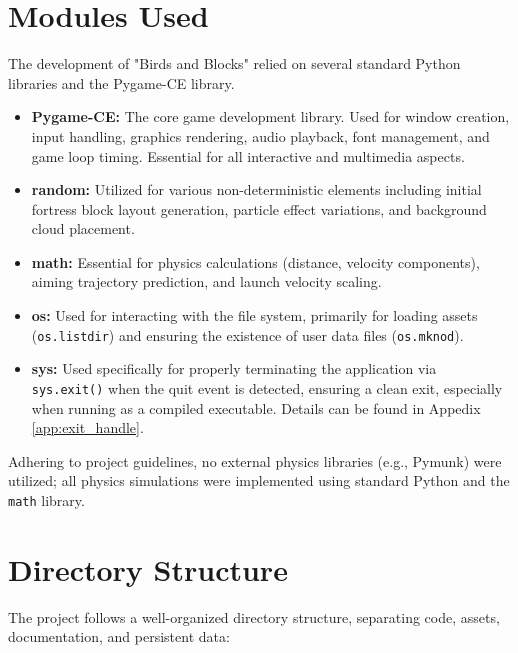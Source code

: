 \documentclass[11pt, a4paper]{article}
\begin{document}
\vspace{4cm}

\section{Modules Used}

The development of "Birds and Blocks" relied on several standard Python libraries and the Pygame-CE library.

\begin{itemize}
    \item \textbf{Pygame-CE:} The core game development library. Used for window creation, input handling, graphics rendering, audio playback, font management, and game loop timing. Essential for all interactive and multimedia aspects.

    \item \textbf{random:} Utilized for various non-deterministic elements including initial fortress block layout generation, particle effect variations, and background cloud placement.
    
    \item \textbf{math:} Essential for physics calculations (distance, velocity components), aiming trajectory prediction, and launch velocity scaling.
    
    \item \textbf{os:} Used for interacting with the file system, primarily for loading assets (\texttt{os.listdir}) and ensuring the existence of user data files (\texttt{os.mknod}).
    
    \item \textbf{sys:} Used specifically for properly terminating the application via \texttt{sys.exit()} when the quit event is detected, ensuring a clean exit, especially when running as a compiled executable. Details can be found in Appedix \ref{app:exit_handle}.

\end{itemize}

Adhering to project guidelines, no external physics libraries (e.g., Pymunk) were utilized; all physics simulations were implemented using standard Python and the \texttt{math} library.

\newpage

\section{Directory Structure}

The project follows a well-organized directory structure, separating code, assets, documentation, and persistent data:
\end{document}
